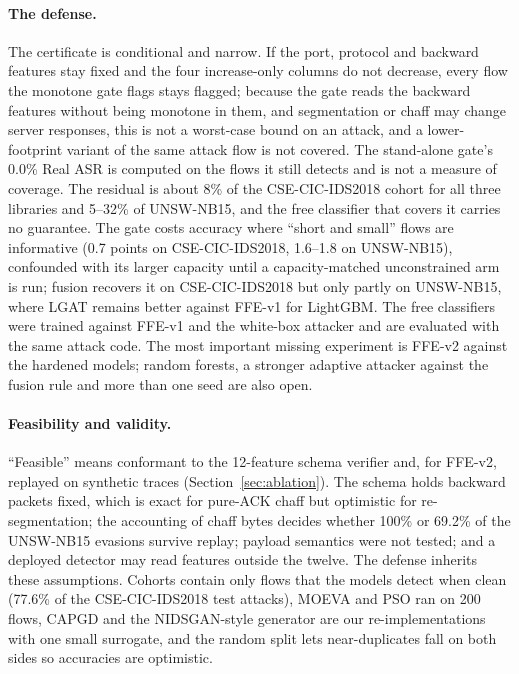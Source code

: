 \paragraph{The defense.} The certificate is conditional and narrow. If the port, protocol and backward features stay fixed and the four increase-only columns do not decrease, every flow the monotone gate flags stays flagged; because the gate reads the backward features without being monotone in them, and segmentation or chaff may change server responses, this is not a worst-case bound on an attack, and a lower-footprint variant of the same attack flow is not covered. The stand-alone gate's 0.0\% Real ASR is computed on the flows it still detects and is not a measure of coverage. The residual is about 8\% of the CSE-CIC-IDS2018 cohort for all three libraries and 5--32\% of UNSW-NB15, and the free classifier that covers it carries no guarantee. The gate costs accuracy where ``short and small'' flows are informative (0.7 points on CSE-CIC-IDS2018, 1.6--1.8 on UNSW-NB15), confounded with its larger capacity until a capacity-matched unconstrained arm is run; fusion recovers it on CSE-CIC-IDS2018 but only partly on UNSW-NB15, where LGAT remains better against FFE-v1 for LightGBM. The free classifiers were trained against FFE-v1 and the white-box attacker and are evaluated with the same attack code. The most important missing experiment is FFE-v2 against the hardened models; random forests, a stronger adaptive attacker against the fusion rule and more than one seed are also open.

\paragraph{Feasibility and validity.} ``Feasible'' means conformant to the 12-feature schema verifier and, for FFE-v2, replayed on synthetic traces (Section~\ref{sec:ablation}). The schema holds backward packets fixed, which is exact for pure-ACK chaff but optimistic for re-segmentation; the accounting of chaff bytes decides whether 100\% or 69.2\% of the UNSW-NB15 evasions survive replay; payload semantics were not tested; and a deployed detector may read features outside the twelve. The defense inherits these assumptions. Cohorts contain only flows that the models detect when clean (77.6\% of the CSE-CIC-IDS2018 test attacks), MOEVA and PSO ran on 200 flows, CAPGD and the NIDSGAN-style generator are our re-implementations with one small surrogate, and the random split lets near-duplicates fall on both sides so accuracies are optimistic.

